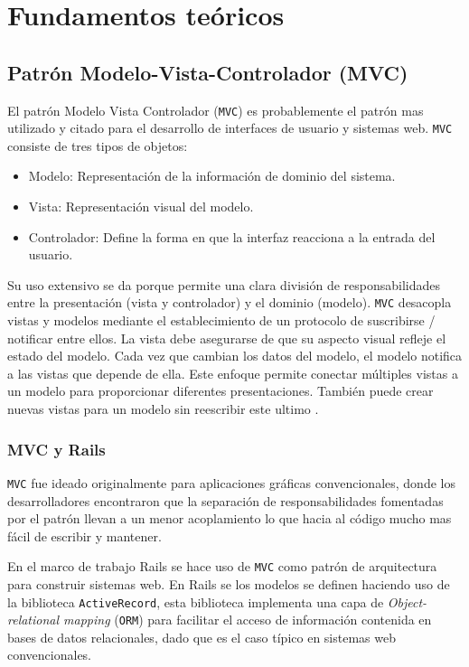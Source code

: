 \chapter{Fundamentos teóricos}

\section{Patrón Modelo-Vista-Controlador (MVC)}
El patrón Modelo Vista Controlador (\texttt{MVC}) es probablemente el patrón
mas utilizado y citado para el desarrollo de interfaces de usuario y sistemas web.
\texttt{MVC} consiste de tres tipos de objetos:

\begin{itemize}
\item Modelo: Representación de la información de dominio del sistema.
\item Vista: Representación visual del modelo.
\item Controlador: Define la forma en que la interfaz reacciona a la entrada
  del usuario.
\end{itemize}


Su uso extensivo se da porque permite una clara división de responsabilidades
entre la presentación (vista y controlador) y el dominio (modelo).
\texttt{MVC} desacopla vistas y modelos mediante el establecimiento de un
protocolo de suscribirse / notificar entre ellos. La vista debe asegurarse
de que su aspecto visual refleje el estado del modelo. Cada vez que cambian
los datos del modelo, el modelo notifica a las vistas que depende de ella.
Este enfoque permite conectar múltiples vistas a un modelo para proporcionar
diferentes presentaciones. También puede crear nuevas vistas para un modelo
sin reescribir este ultimo \cite[pag.~4]{14_gamma_1995}.

\subsection{MVC y Rails}
\texttt{MVC} fue ideado originalmente para aplicaciones gráficas convencionales,
donde los desarrolladores encontraron que la separación de responsabilidades
fomentadas por el patrón llevan a un menor acoplamiento lo que hacia al código
mucho mas fácil de escribir y mantener.

En el marco de trabajo Rails se hace uso de \texttt{MVC} como patrón de arquitectura
para construir sistemas web. En Rails se los modelos se definen haciendo
uso de la biblioteca \texttt{ActiveRecord}, esta biblioteca implementa una capa
de \textit{Object-relational mapping} (\texttt{ORM}) para facilitar el acceso
de información contenida en bases de datos relacionales, dado que es el caso
típico en sistemas web convencionales.


